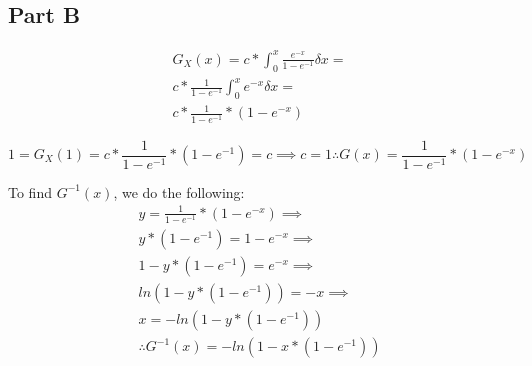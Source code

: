 \documentclass{article}\usepackage[]{graphicx}\usepackage[]{color}
\begin{document}
\subsection*{Part B}
\begin{equation}
\begin{split}
  G_{X}(x) = c*\int_{0}^{x} \frac{e^{-x}}{1-e^{-1}} \delta x =\\
  c*\frac{1}{1-e^{-1}}\int_{0}^{x} e^{-x} \delta x =\\ 
  c * \frac{1}{1-e^{-1}}*(1-e^{-x})
\end{split}
\end{equation}

\begin{equation}
1 = G_X(1) = c * \frac{1}{1-e^{-1}}*(1-e^{-1}) = c \implies c = 1 \therefore G(x) = \frac{1}{1-e^{-1}}*(1-e^{-x})
\end{equation}

To find $G^{-1}(x)$, we do the following:
\begin{equation}
\begin{split}
y = \frac{1}{1-e^{-1}}*(1-e^{-x}) \implies \\
y*(1-e^{-1}) = 1 - e^{-x} \implies \\
1 - y*(1-e^{-1}) = e^{-x} \implies \\
ln(1 - y*(1-e^{-1})) = -x \implies \\
x = -ln(1 - y*(1-e^{-1})) \\
\therefore G^{-1}(x) = -ln(1 - x*(1-e^{-1}))
\end{split}
\end{equation}
\end{document}
